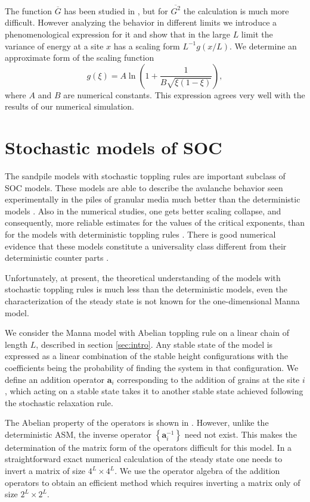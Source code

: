 \documentclass[11pt,a4paper]{book}
\begin{document}
The function $\overline{G}$ has been studied in \cite{punya}, but for
$\overline{G^{2}}$ the calculation is much more difficult. However
analyzing the behavior in different limits we introduce a
phenomenological expression for it and show that in the large
$L$ limit the variance of energy at a site $x$ has a scaling form
$L^{-1}g\left( x/L \right)$. We determine an approximate form of the
scaling function 
\begin{equation}
g\left( \xi \right)=A\ln\left( 1+\frac{1}{B\sqrt{\xi\left( 1-\xi
\right)}} \right),
\end{equation}
where $A$ and $B$ are numerical constants. This expression agrees very
well with the results of our numerical simulation.

\section[Stochastic models]{Stochastic models of SOC}\label{sec:manna}
The sandpile models with stochastic toppling rules are important subclass
of SOC models. These models are able to describe the avalanche behavior seen experimentally in the
piles of granular media much better than the deterministic models \cite{osloexpt}.
Also in the numerical studies, one gets better scaling collapse, and
consequently, more reliable estimates for the values of the critical
exponents, than for the models with deterministic toppling rules
\cite{stochnum}. There is good numerical evidence that these models
constitute a universality class different from their deterministic
counter parts \cite{univ1,univ2,numbtw,numsand1,numsand2}.

Unfortunately, at present, the theoretical understanding of the models
with stochastic toppling rules is much less than the
deterministic models, even the characterization of the
steady state is not known for the one-dimensional Manna model.

We consider the Manna model with Abelian toppling rule on a linear
chain of length $L$, described in section \ref{sec:intro}. Any stable
state of the model is expressed as a linear combination of the stable
height configurations with the coefficients being the probability of finding
the system in that configuration. We define an addition operator
$\mathbf{a}_{i}$
corresponding to the addition of grains at the site $i$, which acting on a
stable state takes it to another stable state achieved following the
stochastic relaxation rule.

The Abelian property of the operators is shown in \cite{dm}.
However, unlike the deterministic ASM, the inverse operator $\left\{
\mathbf{a}_{i}^{-1} \right\}$ need not exist. This makes
the determination of the matrix form of the operators difficult for
this model. In a straightforward exact numerical calculation of the steady state
one needs to invert a matrix of size $4^{L}\times 4^{L}$. We use the
operator algebra of the addition operators to obtain an efficient
method which requires inverting a matrix only of size $2^{L}\times
2^{L}$.
\end{document}
